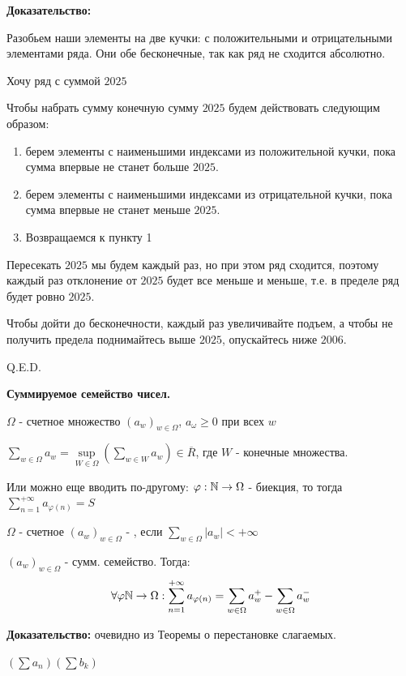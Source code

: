 \textbf{Доказательство:}

Разобьем  наши элементы на две кучки: с положительными и отрицательными элементами ряда. Они обе бесконечные, так как ряд не сходится абсолютно.

Хочу ряд с суммой $2025$

Чтобы набрать сумму конечную сумму $2025$ будем действовать следующим образом:
\begin{enumerate}
    \item берем элементы с наименьшими индексами из положительной кучки, пока сумма впервые не станет больше $2025$.
    \item берем элементы с наименьшими индексами из отрицательной кучки, пока сумма впервые не станет меньше $2025$.
    \item Возвращаемся к пункту 1
\end{enumerate}

Пересекать $2025$ мы будем каждый раз, но при этом ряд сходится, поэтому каждый раз отклонение от $2025$ будет все меньше и меньше, т.е. в пределе ряд будет ровно $2025$.

Чтобы дойти до бесконечности, каждый раз увеличивайте подъем, а чтобы не получить предела поднимайтесь выше $2025$, опускайтесь ниже $2006$.

\hfill Q.E.D.

\textbf{Суммируемое семейство чисел.}

 $\Omega$ - счетное множество $(a_w)_{w\in \Omega}$, $a_\omega \geq 0$ при всех $w$

 $\sum\limits_{w \in \Omega} a_w = \sup\limits_{W\in \Omega}(\sum\limits_{w \in W} a_w) \in \overline{R}$, где $W$ - конечные множества.

Или можно еще вводить по-другому: $\varphi: \mathbb{N} \rightarrow \Omega$ - биекция, то тогда $\sum\limits_{n=1}^{+\infty}a_{\varphi(n)}=S$ 

 $\Omega$ - счетное $(a_w)_{w\in \Omega}$ - , если $\sum\limits_{w\in \Omega} |a_w| < + \infty$


$(a_w)_{w\in \Omega}$ - сумм. семейство. Тогда:
$$\forall \varphi \mathbb{N} \rightarrow \Omega : \sum\limits_{n=1}^{+\infty} a_{\varphi(n)} = \sum_{w\in \Omega} a_w^+-\sum\limits_{w\in \Omega}a_w^-$$

\textbf{Доказательство:} очевидно из Теоремы о перестановке слагаемых.

  $(\sum a_n) (\sum b_k)$

